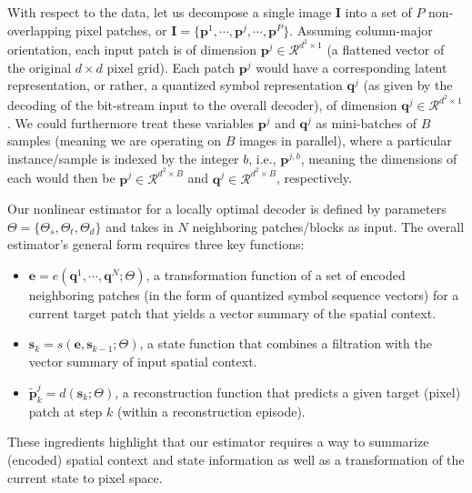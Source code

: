 \documentclass[smallabstract,smallcaptions]{dccpaper}
\begin{document}
With respect to the data, let us decompose a single image $\mathbf{I}$ into a set of $P$ non-overlapping pixel patches, or $\mathbf{I} = \{ \mathbf{p}^1,\cdots,\mathbf{p}^j,\cdots,\mathbf{p}^P \}$. Assuming column-major orientation, each input patch is of dimension $\mathbf{p}^j \in \mathcal{R}^{d^2 \times 1}$ (a flattened vector of the original $d \times d$ pixel grid). Each patch $\mathbf{p}^j$ would have a corresponding latent representation, or rather, a quantized symbol representation $\mathbf{q}^j$ (as given by the decoding of the bit-stream input to the overall decoder), of dimension $\mathbf{q}^j \in \mathcal{R}^{d^2 \times 1}$. We could furthermore treat these variables $\mathbf{p}^j$ and $\mathbf{q}^j$ as mini-batches of $B$ samples (meaning we are operating on $B$ images in parallel), where a particular instance/sample is indexed by the integer $b$, i.e., $\mathbf{p}^{j,b}$, meaning the dimensions of each would then be $\mathbf{p}^j \in \mathcal{R}^{d^2 \times B}$ and $\mathbf{q}^j \in \mathcal{R}^{d^2 \times B}$, respectively.

Our nonlinear estimator for a locally optimal decoder is defined by parameters $\Theta = \{\Theta_s, \Theta_t, \Theta_d\}$ and takes in $N$ neighboring patches/blocks as input. The overall estimator's general form requires three key functions:
\begin{itemize}[noitemsep] %
\item $\mathbf{e} = e(\mathbf{q}^1, \cdots, \mathbf{q}^N ; \Theta)$, a transformation function of a set of encoded neighboring patches (in the form of quantized symbol sequence vectors) for a current target patch that yields a vector summary of the spatial context.
\item $\mathbf{s}_k = s(\mathbf{e}, \mathbf{s}_{k-1} ; \Theta)$, a state function that combines a filtration with the vector summary of input spatial context.
\item $\widetilde{\mathbf{p}}^j_k = d(\mathbf{s}_k ; \Theta)$, a reconstruction function that predicts a given target (pixel) patch at step $k$ (within a reconstruction episode).
\end{itemize}
These ingredients highlight that our estimator requires a way to summarize (encoded) spatial context and state information as well as a transformation of the current state to pixel space. %
\end{document}
